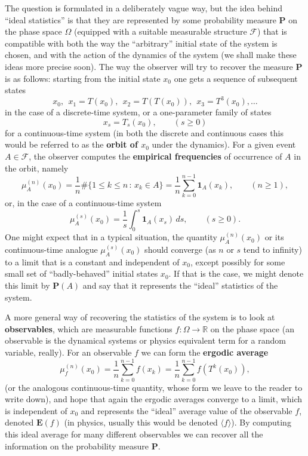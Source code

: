 \documentclass[12pt]{article}
\newcommand{\prob}{\mathbf{P}}
\newcommand{\expec}{\mathbf{E}}
\newcommand{\ind}{\textbf{1}}
\theoremstyle{example}
\begin{document}
The question is formulated in a deliberately vague way, but the idea behind ``ideal statistics'' is that they are represented by some probability measure $\prob$ on the phase space $\Omega$ (equipped with a suitable measurable structure $\mathcal{F}$) that is compatible with both the way the ``arbitrary'' initial state of the system is chosen, and with the action of the dynamics of the system (we shall make these ideas more precise soon). The way the observer will try to recover the measure $\prob$ is as follows: starting from the initial state $x_0$ one gets a sequence of subsequent states
$$ x_0,\ \  x_1 = T(x_0),\ \  x_2 = T(T(x_0)),\ \  x_3=T^{3}(x_0), \ldots $$
in the case of a discrete-time system, or a one-parameter family of states
$$ x_s = T_s(x_0), \qquad (s\ge 0) $$
for a continuous-time system (in both the discrete and continuous cases this would be referred to as the \textbf{orbit of $x_0$} under the dynamics). For a given event $A\in \mathcal{F}$, the observer computes the \textbf{empirical frequencies} of occurrence of $A$ in the orbit, namely
$$ \mu_A^{(n)}(x_0) = \frac{1}{n}\#\{ 1\le k\le n\,:\, x_k\in A\} = \frac1n\sum_{k=0}^{n-1}
\ind_A(x_k), \qquad (n\ge 1),
$$
or, in the case of a continuous-time system
$$
\mu_A^{(s)}(x_0) = \frac{1}{s}\int_0^s \ind_A(x_s)\,ds, \qquad (s\ge 0).
$$
One might expect that in a typical situation, the quantity $\mu_A^{(n)}(x_0)$ or its continuous-time analogue $\mu_A^{(s)}(x_0)$ should converge (as $n$ or $s$ tend to infinity) to a limit that is a constant and independent of $x_0$, except possibly for some small set of ``badly-behaved'' initial states $x_0$. If that is the case, we might denote this limit by $\prob(A)$ and say that it represents the ``ideal'' statistics of the system.

A more general way of recovering the statistics of the system is to look at \textbf{observables}, which are measurable functions $f:\Omega\to \mathbb{R}$ on the phase space (an observable is the dynamical systems or physics equivalent term for a random variable, really). For an observable $f$ we can form the \textbf{ergodic average}
$$ \mu_f^{(n)}(x_0) = \frac1n \sum_{k=0}^{n-1} f(x_k) =\frac1n \sum_{k=0}^{n-1} f(T^k(x_0)), $$
(or the analogous continuous-time quantity, whose form we leave to the reader to write down), and hope that again the ergodic averages converge to a limit, which is independent of $x_0$ and represents the ``ideal'' average value of the observable $f$, denoted $\expec(f)$ (in physics, usually this would be denoted $\langle f \rangle$). By computing this ideal average for many different observables we can recover all the information on the probability measure $\prob$.
\end{document}

